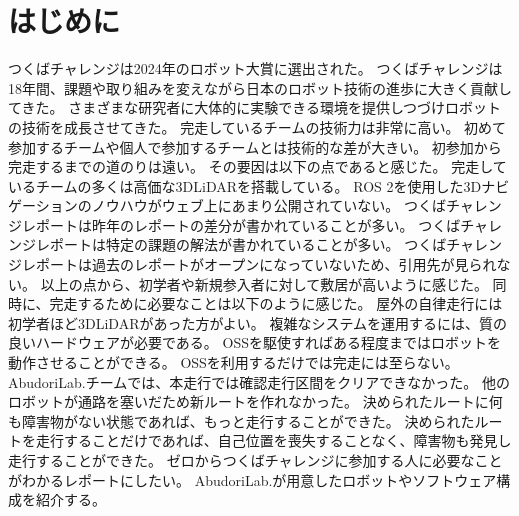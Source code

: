 \section{はじめに}
つくばチャレンジは2024年のロボット大賞に選出された。
つくばチャレンジは18年間、課題や取り組みを変えながら日本のロボット技術の進歩に大きく貢献してきた。
さまざまな研究者に大体的に実験できる環境を提供しつづけロボットの技術を成長させてきた。
完走しているチームの技術力は非常に高い。
初めて参加するチームや個人で参加するチームとは技術的な差が大きい。
初参加から完走するまでの道のりは遠い。
その要因は以下の点であると感じた。
完走しているチームの多くは高価な3DLiDARを搭載している。
ROS 2を使用した3Dナビゲーションのノウハウがウェブ上にあまり公開されていない。
つくばチャレンジレポートは昨年のレポートの差分が書かれていることが多い。
つくばチャレンジレポートは特定の課題の解法が書かれていることが多い。
つくばチャレンジレポートは過去のレポートがオープンになっていないため、引用先が見られない。
以上の点から、初学者や新規参入者に対して敷居が高いように感じた。
同時に、完走するために必要なことは以下のように感じた。
屋外の自律走行には初学者ほど3DLiDARがあった方がよい。
複雑なシステムを運用するには、質の良いハードウェアが必要である。
OSSを駆使すればある程度まではロボットを動作させることができる。
OSSを利用するだけでは完走には至らない。
AbudoriLab.チームでは、本走行では確認走行区間をクリアできなかった。
他のロボットが通路を塞いだため新ルートを作れなかった。
決められたルートに何も障害物がない状態であれば、もっと走行することができた。
決められたルートを走行することだけであれば、自己位置を喪失することなく、障害物も発見し走行することができた。
ゼロからつくばチャレンジに参加する人に必要なことがわかるレポートにしたい。
AbudoriLab.が用意したロボットやソフトウェア構成を紹介する。